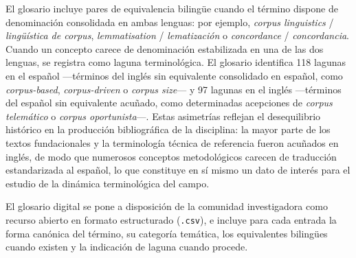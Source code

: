 El glosario incluye pares de equivalencia bilingüe cuando el término dispone de denominación consolidada en ambas lenguas: por ejemplo, \textit{corpus linguistics} / \textit{lingüística de corpus}, \textit{lemmatisation} / \textit{lematización} o \textit{concordance} / \textit{concordancia}. Cuando un concepto carece de denominación estabilizada en una de las dos lenguas, se registra como laguna terminológica. El glosario identifica 118 lagunas en el español ---términos del inglés sin equivalente consolidado en español, como \textit{corpus-based}, \textit{corpus-driven} o \textit{corpus size}--- y 97 lagunas en el inglés ---términos del español sin equivalente acuñado, como determinadas acepciones de \textit{corpus telemático} o \textit{corpus oportunista}---. Estas asimetrías reflejan el desequilibrio histórico en la producción bibliográfica de la disciplina: la mayor parte de los textos fundacionales y la terminología técnica de referencia fueron acuñados en inglés, de modo que numerosos conceptos metodológicos carecen de traducción estandarizada al español, lo que constituye en sí mismo un dato de interés para el estudio de la dinámica terminológica del campo.

El glosario digital se pone a disposición de la comunidad investigadora como recurso abierto en formato estructurado (\texttt{.csv}), e incluye para cada entrada la forma canónica del término, su categoría temática, los equivalentes bilingües cuando existen y la indicación de laguna cuando procede.

